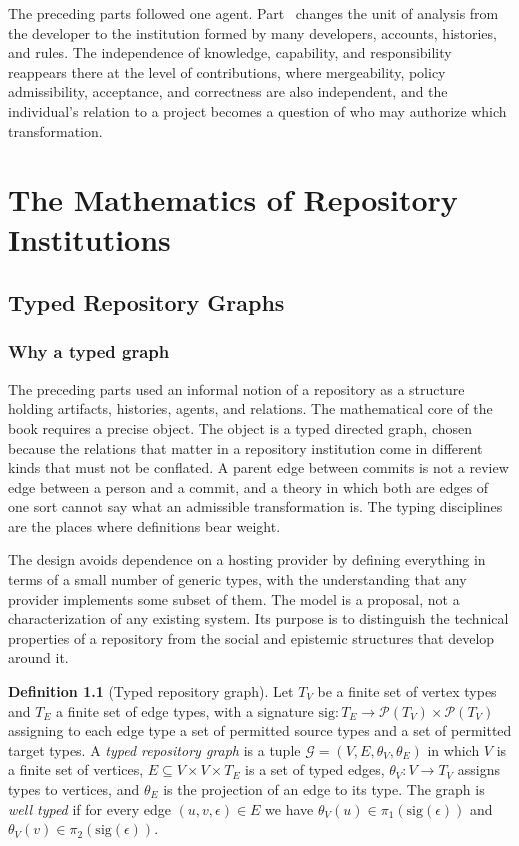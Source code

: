 \documentclass[11pt,twoside,openright]{book}
\theoremstyle{plain}
\theoremstyle{definition}
\newtheorem{definition}[theorem]{Definition}
\theoremstyle{remark}
\newcommand{\Pow}{\mathcal{P}}
\begin{document}
The preceding parts followed one agent. Part~\ref{part:math} changes the unit of analysis from the developer to the institution formed by many developers, accounts, histories, and rules. The independence of knowledge, capability, and responsibility reappears there at the level of contributions, where mergeability, policy admissibility, acceptance, and correctness are also independent, and the individual's relation to a project becomes a question of who may authorize which transformation.

\part{The Mathematics of Repository Institutions}\label{part:math}

\chapter{Typed Repository Graphs}\label{ch:typedgraphs}

\section{Why a typed graph}

The preceding parts used an informal notion of a repository as a structure holding artifacts, histories, agents, and relations. The mathematical core of the book requires a precise object. The object is a typed directed graph, chosen because the relations that matter in a repository institution come in different kinds that must not be conflated. A parent edge between commits is not a review edge between a person and a commit, and a theory in which both are edges of one sort cannot say what an admissible transformation is. The typing disciplines are the places where definitions bear weight.

The design avoids dependence on a hosting provider by defining everything in terms of a small number of generic types, with the understanding that any provider implements some subset of them. The model is a proposal, not a characterization of any existing system. Its purpose is to distinguish the technical properties of a repository from the social and epistemic structures that develop around it.

\begin{definition}[Typed repository graph]\label{def:trg}
Let $T_V$ be a finite set of vertex types and $T_E$ a finite set of edge types, with a signature $\mathrm{sig}:T_E\to\Pow(T_V)\times\Pow(T_V)$ assigning to each edge type a set of permitted source types and a set of permitted target types. A \emph{typed repository graph} is a tuple $\mathcal{G}=(V,E,\theta_V,\theta_E)$ in which $V$ is a finite set of vertices, $E\subseteq V\times V\times T_E$ is a set of typed edges, $\theta_V:V\to T_V$ assigns types to vertices, and $\theta_E$ is the projection of an edge to its type. The graph is \emph{well typed} if for every edge $(u,v,\epsilon)\in E$ we have $\theta_V(u)\in\pi_1(\mathrm{sig}(\epsilon))$ and $\theta_V(v)\in\pi_2(\mathrm{sig}(\epsilon))$.
\end{definition}
\end{document}

